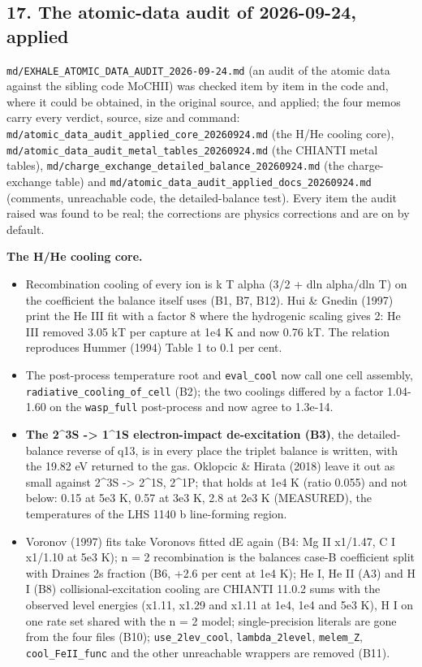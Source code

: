 \documentclass[english,a4paper]{my_memo}
\providecommand{\tightlist}{\setlength{\itemsep}{0pt}\setlength{\parskip}{0pt}}
\begin{document}
\subsection{17. The atomic-data audit of 2026-09-24, applied}\label{17-the-atomic-data-audit-of-2026-09-24-applied}

\texttt{md/EXHALE\_ATOMIC\_DATA\_AUDIT\_2026-09-24.md} (an audit of the atomic data
against the sibling code MoCHII) was checked item by item in the code and,
where it could be obtained, in the original source, and applied; the four
memos carry every verdict, source, size and command:
\texttt{md/atomic\_data\_audit\_applied\_core\_20260924.md} (the H/He cooling core),
\texttt{md/atomic\_data\_audit\_metal\_tables\_20260924.md} (the CHIANTI metal
tables), \texttt{md/charge\_exchange\_detailed\_balance\_20260924.md} (the
charge-exchange table) and \texttt{md/atomic\_data\_audit\_applied\_docs\_20260924.md}
(comments, unreachable code, the detailed-balance test). Every item the
audit raised was found to be real; the corrections are physics corrections
and are on by default.

\textbf{The H/He cooling core.}

\begin{itemize}
\tightlist
\item
  Recombination cooling of every ion is k T alpha (3/2 + dln alpha/dln T)
  on the coefficient the balance itself uses (B1, B7, B12). Hui \& Gnedin
  (1997) print the He III fit with a factor 8 where the hydrogenic scaling
  gives 2: He III removed 3.05 kT per capture at 1e4 K and now 0.76 kT. The
  relation reproduces Hummer (1994) Table 1 to 0.1 per cent.
\item
  The post-process temperature root and \texttt{eval\_cool} now call one cell
  assembly, \texttt{radiative\_cooling\_of\_cell} (B2); the two coolings differed by
  a factor 1.04-1.60 on the \texttt{wasp\_full} post-process and now agree to
  1.3e-14.
\item
  \textbf{The 2\^{}3S -\textgreater{} 1\^{}1S electron-impact de-excitation (B3)}, the
  detailed-balance reverse of q13, is in every place the triplet balance is
  written, with the 19.82 eV returned to the gas. Oklopcic \& Hirata (2018)
  leave it out as small against 2\^{}3S -\textgreater{} 2\^{}1S, 2\^{}1P; that holds at 1e4 K
  (ratio 0.055) and not below: 0.15 at 5e3 K, 0.57 at 3e3 K, 2.8 at 2e3 K
  (MEASURED), the temperatures of the LHS 1140 b line-forming region.
\item
  Voronov (1997) fits take Voronov\textquotesingle s fitted dE again (B4: Mg II x1/1.47, C I
  x1/1.10 at 5e3 K); n = 2 recombination is the balance\textquotesingle s case-B coefficient
  split with Draine\textquotesingle s 2s fraction (B6, +2.6 per cent at 1e4 K); He I, He II
  (A3) and H I (B8) collisional-excitation cooling are CHIANTI 11.0.2 sums
  with the observed level energies (x1.11, x1.29 and x1.11 at 1e4, 1e4 and
  5e3 K), H I on one rate set shared with the n = 2 model; single-precision
  literals are gone from the four files (B10); \texttt{use\_2lev\_cool},
  \texttt{lambda\_2level}, \texttt{melem\_Z}, \texttt{cool\_FeII\_func} and the other unreachable
  wrappers are removed (B11).
\end{itemize}
\end{document}
